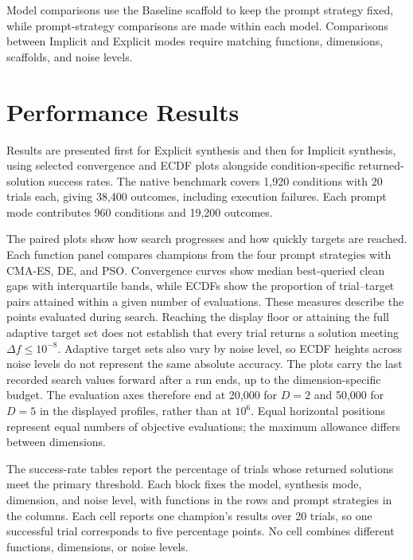 Model comparisons use the Baseline scaffold to keep the prompt
strategy fixed, while prompt-strategy comparisons are made within
each model. Comparisons between Implicit and Explicit modes require
matching functions, dimensions, scaffolds, and noise levels.

\FloatBarrier

\section{Performance Results}
\label{sec:benchmark_results}

Results are presented first for Explicit synthesis and then for
Implicit synthesis, using selected convergence and ECDF plots
alongside condition-specific returned-solution success rates.
The native benchmark covers 1,920 conditions with 20 trials each,
giving 38,400 outcomes, including execution failures. Each prompt
mode contributes 960 conditions and 19,200 outcomes.

The paired plots show how search progresses and how quickly targets
are reached. Each function panel compares champions from the four
prompt strategies with CMA-ES, DE, and PSO. Convergence curves show
median best-queried clean gaps with interquartile bands, while ECDFs
show the proportion of trial--target pairs attained within a given
number of evaluations. These measures describe the points evaluated
during search. Reaching the display floor or attaining the full
adaptive target set does not establish that every trial returns a
solution meeting $\Delta f\leq10^{-8}$. Adaptive target sets also
vary by noise level, so ECDF heights across noise levels do not
represent the same absolute accuracy.
The plots carry the last recorded search values forward after
a run ends, up to the dimension-specific budget. The evaluation axes
therefore end at 20,000 for $D=2$ and 50,000 for $D=5$ in the
displayed profiles, rather than at $10^6$. Equal horizontal positions
represent equal numbers of objective evaluations; the maximum
allowance differs between dimensions.

The success-rate tables report the percentage of trials whose
returned solutions meet the primary threshold. Each block fixes
the model, synthesis mode, dimension, and noise level, with
functions in the rows and prompt strategies in the columns.
Each cell reports one champion's results over 20 trials, so one
successful trial corresponds to five percentage points. No cell
combines different functions, dimensions, or noise levels.

